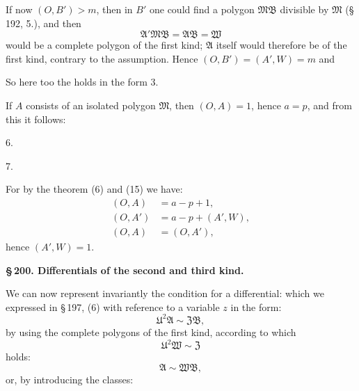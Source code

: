 If now $(O, B') > m$, then in $B'$ one could find a polygon
$\mathfrak{M}\mathfrak{B}$ divisible by $\mathfrak{M}$ (\S\,192, 5.), and then
\[
\mathfrak{A}' \mathfrak{M} \mathfrak{B} = \mathfrak{A} \mathfrak{B} = \mathfrak{W}
\]
would be a complete polygon of the first kind; $\mathfrak{A}$ itself would
therefore be of the first kind, contrary to the assumption. Hence
$(O, B') = (A', W) = m$ and

So here too the  holds in the
form 3.

If $A$ consists of an isolated polygon $\mathfrak{M}$, then $(O, A) = 1$,
hence $a = p$, and from this it follows:

6. 

7. 

For by the theorem (6) and (15) we have:
\[
\begin{aligned}
(O, A) &= a - p + 1, \\
(O, A') &= a - p + (A', W), \\
(O, A) &= (O, A'),
\end{aligned}
\]
hence $(A', W) = 1$.

\begin{center}
\textbf{\S\,200. Differentials of the second and third kind.}
\end{center}
We can now represent invariantly the condition for a differential:
\weq{1}{dJ = \frac{\mathfrak{A}}{\mathfrak{B}},}
which we expressed in \S\,197, (6) with reference to a variable $z$ in the
form:
\[
\mathfrak{U}^2 \mathfrak{A} \sim \mathfrak{Z} \mathfrak{B},
\]
by using the complete polygons of the first kind, according to
which
\[
\mathfrak{U}^2 \mathfrak{W} \sim \mathfrak{Z}
\]
holds:
\[
\mathfrak{A} \sim \mathfrak{W} \mathfrak{B},
\]
or, by introducing the classes:
